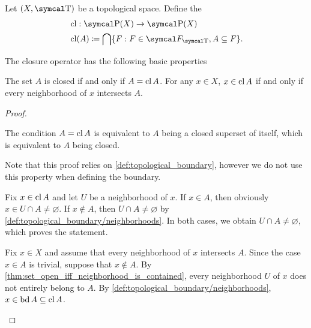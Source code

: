 \begin{definition}\label{def:closure_operator}\cite[33]{Engelking1989}
  Let \( (X, \CT) \) be a topological space. Define the 
  \begin{align*}
    &\Cl: \Power(X) \to \Power(X) \\
    &\Cl(A) \coloneqq \bigcap \{ F : F \in \Cal{F}_{\CT}, A \subseteq F \}.
  \end{align*}
\end{definition}

\begin{proposition}\label{thm:closure_operator_properties}
  The closure operator has the following basic properties
  \begin{propenum}
     The set \( A \) is closed if and only if \( A = \operatorname{cl} A \).
     For any \( x \in X \), \( x \in \operatorname{cl} A \) if and only if every neighborhood of \( x \) intersects \( A \).
  \end{propenum}
\end{proposition}
\begin{proof}
  \begin{propenum}
     The condition \( A = \operatorname{cl}{A} \) is equivalent to \( A \) being a closed superset of itself, which is equivalent to \( A \) being closed.

     Note that this proof relies on \cref{def:topological_boundary}, however we do not use this property when defining the boundary.

    \begin{description}
      \Implies Fix \( x \in \operatorname{cl}{A} \) and let \( U \) be a neighborhood of \( x \). If \( x \in A \), then obviously \( x \in U \cap A \neq \varnothing \). If \( x \not\in A \), then \( U \cap A \neq \varnothing \) by \cref{def:topological_boundary/neighborhoods}. In both cases, we obtain \( U \cap A \neq \varnothing \), which proves the statement.

      \ImpliedBy Fix \( x \in X \) and assume that every neighborhood of \( x \) intersects \( A \). Since the case \( x \in A \) is trivial, suppose that \( x \not\in A \). By \cref{thm:set_open_iff_neighborhood_is_contained}, every neighborhood \( U \) of \( x \) does not entirely belong to \( A \). By \cref{def:topological_boundary/neighborhoods}, \( x \in \operatorname{bd} A \subseteq \operatorname{cl} A \).
    \end{description}
  \end{propenum}
\end{proof}

